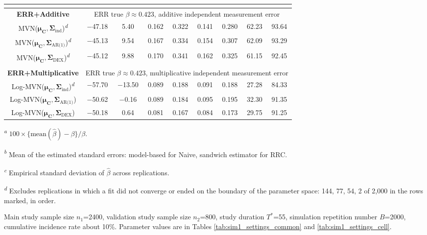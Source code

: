 \begin{table}[!htbp]
\begin{minipage}{\textwidth}
\begin{tabular}{|c|c|c|c|c|c|c|c|c|}
\hline
\multicolumn{9}{|c|}{}\\
\hline
\bf ERR+Additive & \multicolumn{8}{c|}{ERR true $\beta\approx 0.423$, additive independent measurement error} \\
\hline
MVN($\bm{\mu_C},\bm{\Sigma}_{\text{ind}}$)\textsuperscript{\textit{d}} & $-$47.18 & 5.40 & 0.162 & 0.322 & 0.141 & 0.280 & 62.23 & 93.64 \\
\hline
MVN($\bm{\mu_C},\bm{\Sigma}_{\text{AR(1)}}$)\textsuperscript{\textit{d}} & $-$45.13 & 9.54 & 0.167 & 0.334 & 0.154 & 0.307 & 62.09 & 93.29 \\
\hline
MVN($\bm{\mu_C},\bm{\Sigma}_{\text{DEX}}$)\textsuperscript{\textit{d}} & $-$45.12 & 9.88 & 0.170 & 0.341 & 0.162 & 0.325 & 61.15 & 92.45 \\
\hline
\multicolumn{9}{|c|}{}\\
\hline
\bf ERR+Multiplicative & \multicolumn{8}{c|}{ERR true $\beta\approx 0.423$, multiplicative independent measurement error} \\
\hline
Log-MVN($\bm{\mu_C},\bm{\Sigma}_{\text{ind}}$)\textsuperscript{\textit{d}} & $-$57.70 & $-$13.50 & 0.089 & 0.188 & 0.091 & 0.188 & 27.28 & 84.33 \\
\hline
Log-MVN($\bm{\mu_C},\bm{\Sigma}_{\text{AR(1)}}$) & $-$50.62 & $-$0.16 & 0.089 & 0.184 & 0.095 & 0.195 & 32.30 & 91.35 \\
\hline
Log-MVN($\bm{\mu_C},\bm{\Sigma}_{\text{DEX}}$) & $-$50.18 & 0.64 & 0.081 & 0.167 & 0.084 & 0.173 & 29.75 & 91.25 \\
\hline
\end{tabular}
\par
{\raggedright\footnotesize
\begin{list}{}{\setlength{\leftmargin}{1.2em}\setlength{\labelwidth}{0.8em}\setlength{\labelsep}{0.4em}%
  \setlength{\itemsep}{0pt}\setlength{\parsep}{0pt}\setlength{\topsep}{4pt}\setlength{\partopsep}{0pt}}
\item[\textsuperscript{\textit{a}}] $100\times\{\text{mean}(\hat{\beta})-\beta\}/\beta$.
\item[\textsuperscript{\textit{b}}] Mean of the estimated standard errors: model-based for Naive, sandwich estimator for RRC.
\item[\textsuperscript{\textit{c}}] Empirical standard deviation of $\hat{\beta}$ across replications.
\item[\textsuperscript{\textit{d}}] Excludes replications in which a fit did not converge or ended on the boundary of the parameter space: 144, 77, 54, 2 of 2,000 in the rows marked, in order.
\item[] Main study sample size $n_1$=2400, validation study sample size $n_2$=800, study duration $T^{*}$=55, simulation repetition number $B$=2000, cumulative incidence rate about 10\%. Parameter values are in Tables \ref{tab:sim1_settings_common} and \ref{tab:sim1_settings_cell}.
\end{list}
\par}
\end{minipage}
\label{tab:sim1}
\end{table}
